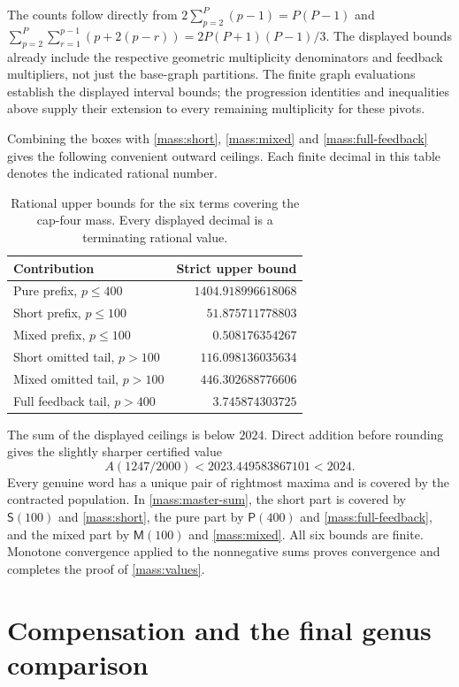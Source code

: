\documentclass[11pt]{amsart}
\theoremstyle{definition}
\theoremstyle{remark}
\numberwithin{equation}{section}
\begin{document}
The counts follow directly from
$2\sum_{p=2}^P(p-1)=P(P-1)$ and
$\sum_{p=2}^P\sum_{r=1}^{p-1}(p+2(p-r))
=2P(P+1)(P-1)/3$. The displayed bounds already include the respective
geometric multiplicity denominators and feedback multipliers, not just
the base-graph partitions. The finite graph evaluations establish the
displayed interval bounds;
the progression identities and inequalities above supply their extension
to every remaining multiplicity for these pivots.

Combining the boxes with \eqref{mass:short}, \eqref{mass:mixed} and
\eqref{mass:full-feedback} gives the following convenient outward
ceilings. Each finite decimal in this table denotes the indicated
rational number.

\begin{table}[htbp]
\centering
\caption{Rational upper bounds for the six terms covering the cap-four
mass. Every displayed decimal is a terminating rational value.}
\label{tab:mass-assembly}
\begin{tabular}{lr}
\hline
Contribution & Strict upper bound\\\hline
Pure prefix, $p\le400$ & $1404.918996618068$\\
Short prefix, $p\le100$ & $51.875711778803$\\
Mixed prefix, $p\le100$ & $0.508176354267$\\
Short omitted tail, $p>100$ & $116.098136035634$\\
Mixed omitted tail, $p>100$ & $446.302688776606$\\
Full feedback tail, $p>400$ & $3.745874303725$\\\hline
\end{tabular}
\end{table}

The sum of the displayed ceilings is below $2024$. Direct addition
before rounding gives the slightly sharper certified value
\[
 A(1247/2000)<2023.449583867101<2024.
\]
Every genuine word has a unique pair of rightmost maxima and is
covered by the contracted population. In \eqref{mass:master-sum}, the
short part is covered by $\mathsf S(100)$ and \eqref{mass:short}, the
pure part by $\mathsf P(400)$ and \eqref{mass:full-feedback}, and the
mixed part by $\mathsf M(100)$ and \eqref{mass:mixed}. All six bounds
are finite. Monotone convergence applied to the nonnegative sums proves
convergence and completes the proof of \eqref{mass:values}.

\section{Compensation and the final genus comparison}
\label{mass:final}
\end{document}
